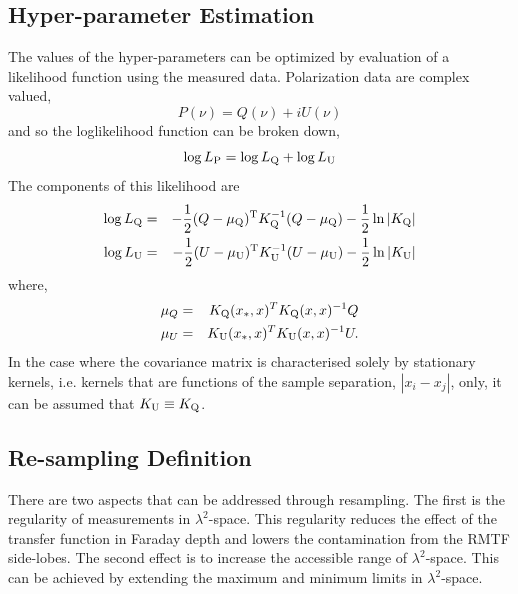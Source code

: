 \documentclass[fleqn,usenatbib]{mnras}
\begin{document}
\subsection{Hyper-parameter Estimation}
\label{sec:parms}

The values of the hyper-parameters can be optimized by evaluation of a likelihood function using the measured data. Polarization data are complex valued,
%
\begin{equation}
P(\nu) = Q(\nu) + iU(\nu)
\end{equation}
%
and so the loglikelihood function can be broken down,
%
\begin{equation}
\log L_{\rm P} = \log L_{\rm Q} + \log L_{\rm U}
\end{equation}
%
The components of this likelihood are
%
\begin{eqnarray}
\log L_{\rm Q} &=& -\frac{1}{2}(Q - \mu_{\rm Q})^{\rm T}K_{\rm Q}^{-1}(Q - \mu_{\rm Q}) - \frac{1}{2}\ln |K_{\rm Q}|\\
\log L_{\rm U} &=& -\frac{1}{2}(U - \mu_{\rm U})^{\rm T}K_{\rm U}^{-1}(U - \mu_{\rm U}) - \frac{1}{2}\ln |K_{\rm U}|
\end{eqnarray}
%
where,
%
\begin{eqnarray}
\mu_{Q} &=& K_{\rm Q}(x_{\ast},x)^T K_{\rm Q}(x,x)^{-1} Q\\
\mu_{U} &=& K_{\rm U}(x_{\ast},x)^T K_{\rm U}(x,x)^{-1} U.
\end{eqnarray}
%
In the case where the covariance matrix is characterised solely by stationary kernels, i.e. kernels that are functions of the sample separation, $|x_i - x_j|$, only, it can be assumed that $K_{\rm U}\equiv K_{\rm Q}$.

\subsection{Re-sampling Definition}
\label{sec:resamp}

There are two aspects that can be addressed through resampling. The first is the regularity of measurements in $\lambda^2$-space. This regularity reduces the effect of the transfer function in Faraday depth and lowers the contamination from the RMTF side-lobes. The second effect is to increase the accessible range of $\lambda^2$-space. This can be achieved by extending the maximum and minimum limits in $\lambda^2$-space.
\end{document}
